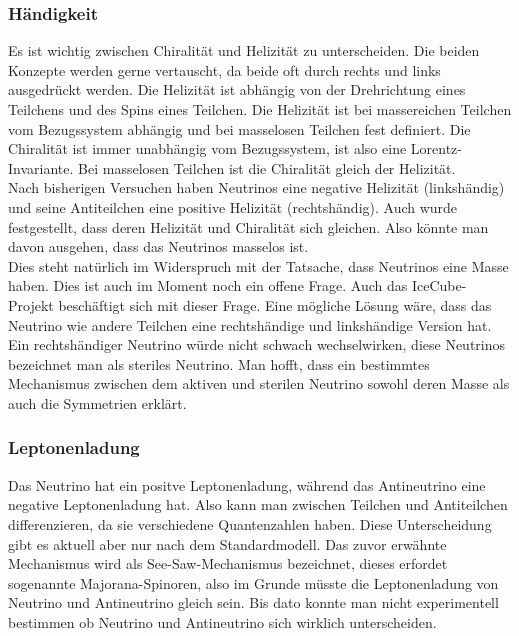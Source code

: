 \subsubsection{Händigkeit}

Es ist wichtig zwischen Chiralität und Helizität zu unterscheiden.
Die beiden Konzepte werden gerne vertauscht, da beide oft durch rechts und links ausgedrückt werden.
Die Helizität ist abhängig von der Drehrichtung eines Teilchens und des Spins eines Teilchen. \cite{Gold1958}
Die Helizität ist bei massereichen Teilchen vom Bezugssystem abhängig und bei masselosen Teilchen fest
definiert. Die Chiralität ist immer unabhängig vom Bezugssystem, ist also eine Lorentz-Invariante.
Bei masselosen Teilchen ist die Chiralität gleich der Helizität.\\
Nach bisherigen Versuchen haben Neutrinos eine negative Helizität (linkshändig) und seine
Antiteilchen eine positive Helizität (rechtshändig).
Auch wurde festgestellt, dass deren Helizität und Chiralität sich gleichen. Also könnte man davon ausgehen, dass
das Neutrinos masselos ist. \\
Dies steht natürlich im Widerspruch mit der Tatsache, dass Neutrinos eine Masse haben.
Dies ist auch im Moment noch ein offene Frage. Auch das IceCube-Projekt beschäftigt sich mit dieser Frage.
Eine mögliche Lösung wäre, dass das Neutrino wie andere Teilchen eine rechtshändige und linkshändige Version hat.
Ein rechtshändiger Neutrino würde nicht schwach wechselwirken, diese Neutrinos bezeichnet man als steriles
Neutrino. Man hofft, dass ein bestimmtes Mechanismus zwischen dem aktiven und sterilen Neutrino sowohl deren Masse
als auch die Symmetrien erklärt.

\subsubsection{Leptonenladung}

Das Neutrino hat ein positve Leptonenladung, während das Antineutrino eine negative Leptonenladung hat. Also kann man
zwischen Teilchen und Antiteilchen differenzieren, da sie verschiedene Quantenzahlen haben.\cite{Stoecker2000}
Diese Unterscheidung gibt es aktuell aber nur nach dem Standardmodell. Das zuvor erwähnte Mechanismus wird als See-Saw-Mechanismus
bezeichnet, dieses erfordet sogenannte Majorana-Spinoren, also im Grunde müsste die Leptonenladung von Neutrino und
Antineutrino gleich sein. Bis dato konnte man nicht experimentell bestimmen ob Neutrino und Antineutrino sich wirklich
unterscheiden.

